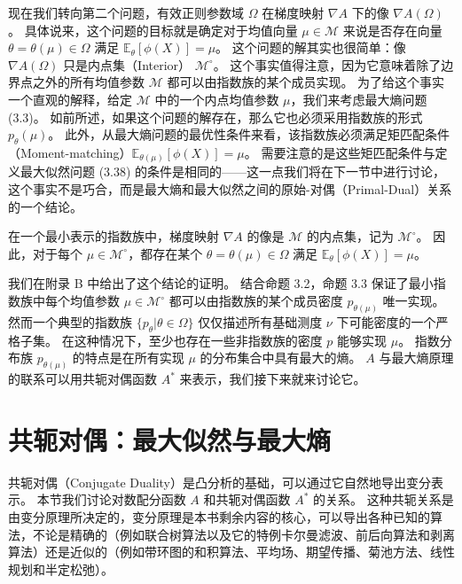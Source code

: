 现在我们转向第二个问题，有效正则参数域 $\Omega$ 在梯度映射 $\nabla A$ 下的像 $\nabla A(\Omega)$。
具体说来，这个问题的目标就是确定对于均值向量 $\mu \in \mathcal{M}$ 来说是否存在向量 $\theta = \theta(\mu) \in \Omega$ 满足 $\mathbb{E}_{\theta}[\phi(X)] = \mu$。
这个问题的解其实也很简单：像 $\nabla A(\Omega)$ 只是内点集（Interior） $\mathcal{M}^\circ$。
这个事实值得注意，因为它意味着除了边界点之外的所有均值参数 $\mathcal{M}$ 都可以由指数族的某个成员实现。
为了给这个事实一个直观的解释，给定 $\mathcal{M}$ 中的一个内点均值参数 $\mu$，我们来考虑最大熵问题 (3.3)。
如前所述，如果这个问题的解存在，那么它也必须采用指数族的形式 $p_{\theta}(\mu)$。
此外，从最大熵问题的最优性条件来看，该指数族必须满足矩匹配条件（Moment-matching）$\mathbb{E}_{\theta(\mu)}[\phi(X)] = \mu$。
需要注意的是这些矩匹配条件与定义最大似然问题 (3.38) 的条件是相同的——这一点我们将在下一节中进行讨论，这个事实不是巧合，而是最大熵和最大似然之间的原始-对偶（Primal-Dual）关系的一个结论。

\begin{tcolorbox}
\begin{prop}

在一个最小表示的指数族中，梯度映射 $\nabla A$ 的像是 $\mathcal{M}$ 的内点集，记为 $\mathcal{M}^\circ$。
因此，对于每个 $\mu \in \mathcal{M}^\circ$，都存在某个 $\theta = \theta(\mu) \in \Omega$ 满足 $\mathbb{E}_{\theta}[\phi(X)] = \mu$。

\end{prop}
\end{tcolorbox}

我们在附录 B 中给出了这个结论的证明。
结合命题 3.2，命题 3.3 保证了最小指数族中每个均值参数 $\mu \in \mathcal{M}^\circ$ 都可以由指数族的某个成员密度 $p_{\theta(\mu)}$ 唯一实现。
然而一个典型的指数族 $\{p_{\theta}| \theta \in \Omega\}$ 仅仅描述所有基础测度 $\nu$ 下可能密度的一个严格子集。
在这种情况下，至少也存在一些非指数族的密度 $p$ 能够实现 $\mu$。
指数分布族 $p_{\theta(\mu)}$ 的特点是在所有实现 $\mu$ 的分布集合中具有最大的熵。
$A$ 与最大熵原理的联系可以用共轭对偶函数 $A^*$ 来表示，我们接下来就来讨论它。

\section{共轭对偶：最大似然与最大熵}

共轭对偶（Conjugate Duality）是凸分析的基础，可以通过它自然地导出变分表示。
本节我们讨论对数配分函数 $A$ 和共轭对偶函数 $A^*$ 的关系。
这种共轭关系是由变分原理所决定的，变分原理是本书剩余内容的核心，可以导出各种已知的算法，不论是精确的（例如联合树算法以及它的特例卡尔曼滤波、前后向算法和剥离算法）还是近似的（例如带环图的和积算法、平均场、期望传播、菊池方法、线性规划和半定松弛）。

